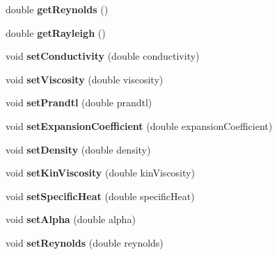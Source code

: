 \begin{DoxyCompactItemize}
double {\bfseries get\+Reynolds} ()
\item 
\mbox{\label{class_air_properties_a93f0be70b3e396ae2f7f2dfd47d13c13}} 
double {\bfseries get\+Rayleigh} ()
\item 
\mbox{\label{class_air_properties_a3bfb9925671f251f5983f919d663b065}} 
void {\bfseries set\+Conductivity} (double conductivity)
\item 
\mbox{\label{class_air_properties_acbf2ba9c4555699e82e76f6f250a7613}} 
void {\bfseries set\+Viscosity} (double viscosity)
\item 
\mbox{\label{class_air_properties_aa01afbbf8dc220b2db641623417fcaa6}} 
void {\bfseries set\+Prandtl} (double prandtl)
\item 
\mbox{\label{class_air_properties_acd587b762844b90db835b8796b45ca50}} 
void {\bfseries set\+Expansion\+Coefficient} (double expansion\+Coefficient)
\item 
\mbox{\label{class_air_properties_af3c351767343b2e15e6b82940865ad07}} 
void {\bfseries set\+Density} (double density)
\item 
\mbox{\label{class_air_properties_aed8aee8df557e3cdac8eb7903e116e15}} 
void {\bfseries set\+Kin\+Viscosity} (double kin\+Viscosity)
\item 
\mbox{\label{class_air_properties_a42a4fd4914ca8ca93d20da4a2e51a806}} 
void {\bfseries set\+Specific\+Heat} (double specific\+Heat)
\item 
\mbox{\label{class_air_properties_a5313343ff1ee238e086ad42bab836449}} 
void {\bfseries set\+Alpha} (double alpha)
\item 
\mbox{\label{class_air_properties_aed80404187136ab3c6b0afff9695314c}} 
void {\bfseries set\+Reynolds} (double reynolds)
\item 
\mbox{\label{class_air_properties_a3f6aaaa2eb865479ff31c88529803bbf}} 

\end{DoxyCompactItemize}
